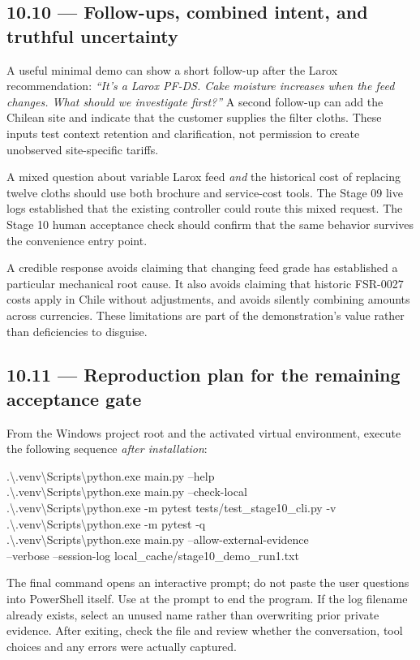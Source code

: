 \documentclass[11pt,a4paper]{article}
\DeclareRobustCommand{\code}[1]{{\ttfamily\small\detokenize{#1}}}
\begin{document}
\subsection{10.10 --- Follow-ups, combined intent, and truthful uncertainty}
A useful minimal demo can show a short follow-up after the Larox recommendation: \emph{``It's a Larox PF-DS. Cake moisture increases when the feed changes. What should we investigate first?''} A second follow-up can add the Chilean site and indicate that the customer supplies the filter cloths. These inputs test context retention and clarification, not permission to create unobserved site-specific tariffs.

A mixed question about variable Larox feed \emph{and} the historical cost of replacing twelve cloths should use both brochure and service-cost tools. The Stage 09 live logs established that the existing controller could route this mixed request. The Stage 10 human acceptance check should confirm that the same behavior survives the convenience entry point.

A credible response avoids claiming that changing feed grade has established a particular mechanical root cause. It also avoids claiming that historic FSR-0027 costs apply in Chile without adjustments, and avoids silently combining amounts across currencies. These limitations are part of the demonstration's value rather than deficiencies to disguise.

\subsection{10.11 --- Reproduction plan for the remaining acceptance gate}
From the Windows project root and the activated virtual environment, execute the following sequence \emph{after installation}:
\begin{examplebox}
\footnotesize\ttfamily
.\textbackslash.venv\textbackslash Scripts\textbackslash python.exe main.py --help\\[3pt]
.\textbackslash.venv\textbackslash Scripts\textbackslash python.exe main.py --check-local\\[3pt]
.\textbackslash.venv\textbackslash Scripts\textbackslash python.exe -m pytest tests/test\_stage10\_cli.py -v\\[3pt]
.\textbackslash.venv\textbackslash Scripts\textbackslash python.exe -m pytest -q\\[3pt]
.\textbackslash.venv\textbackslash Scripts\textbackslash python.exe main.py --allow-external-evidence\\
\hspace*{1.4em}--verbose --session-log local\_cache/stage10\_demo\_run1.txt
\end{examplebox}
The final command opens an interactive prompt; do not paste the user questions into PowerShell itself. Use \code{exit} at the \code{You >} prompt to end the program. If the log filename already exists, select an unused name rather than overwriting prior private evidence. After exiting, check the file and review whether the conversation, tool choices and any errors were actually captured.
\end{document}
